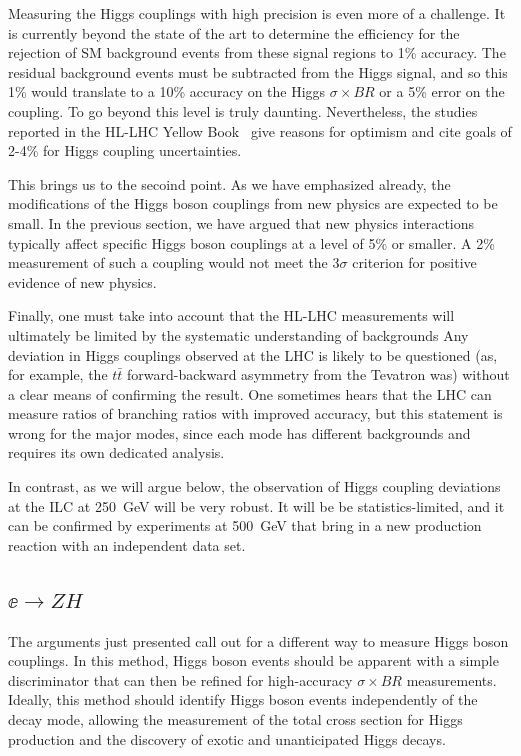 Measuring  the Higgs couplings with high precision is even more of a challenge.   It is currently beyond the state of the art to determine the efficiency  for the rejection of SM background events from these signal regions to 1\% accuracy.   The residual background events must be subtracted from the Higgs signal, and so this 1\% would translate to a 10\% accuracy on the Higgs $\sigma\times BR$ or a 5\% error on the coupling. To go beyond this level is truly daunting.  Nevertheless, the studies reported in the HL-LHC Yellow Book~\cite{Cepeda:2019klc} give reasons for optimism and cite goals of 2-4\%  for Higgs coupling uncertainties.

This brings us to the secoind point.  As we have emphasized already, the modifications of the Higgs boson couplings from new  physics are expected to be small.  In the previous section, we have argued that new physics interactions typically  affect specific
Higgs boson couplings at a level of 5\% or smaller.  A 2\% measurement of such a coupling  
would not meet the $3\sigma$ criterion for positive evidence of new physics.

Finally, one must take into account that the HL-LHC measurements will ultimately be limited by the systematic understanding of backgrounds  Any deviation in Higgs couplings observed at the LHC is  likely to be questioned (as, for example, the $t\bar t$ forward-backward asymmetry from the Tevatron was) without a clear means of confirming the result. 
One sometimes hears that the LHC can measure ratios of branching ratios with improved accuracy, but this statement is wrong for the major modes, since each mode has different backgrounds and requires its own dedicated analysis. 

 In contrast, as we will argue below, the observation of Higgs coupling deviations at the ILC at  250~GeV will be very robust.  It will be be statistics-limited,  and it can be confirmed by experiments at 500~GeV that bring in a new production reaction with an independent  data set. 


\subsection{$\ee\to ZH$}

The arguments just presented call out for a different way to measure Higgs boson couplings.   In this method, Higgs boson events should be apparent with a simple discriminator that can then be refined for high-accuracy $\sigma\times BR$ measurements.  Ideally, this method should identify Higgs boson events independently of the decay mode, allowing the measurement of the total cross section for Higgs production and the discovery of exotic and unanticipated Higgs decays.


